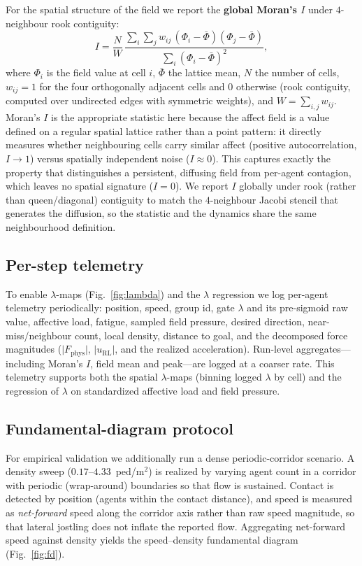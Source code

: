 \documentclass[sigconf,nonacm]{acmart}
\begin{document}
For the spatial structure of the field we report the \textbf{global Moran's
$I$} under $4$-neighbour rook contiguity:
\begin{equation}
I = \frac{N}{W}\,
\frac{\sum_i \sum_j w_{ij}\,(\Phi_i-\bar{\Phi})(\Phi_j-\bar{\Phi})}
     {\sum_i (\Phi_i-\bar{\Phi})^2},
\end{equation}
where $\Phi_i$ is the field value at cell $i$, $\bar{\Phi}$ the lattice mean,
$N$ the number of cells, $w_{ij}=1$ for the four orthogonally adjacent cells
and $0$ otherwise (rook contiguity, computed over undirected edges with
symmetric weights), and $W=\sum_{i,j} w_{ij}$. Moran's $I$ is the appropriate
statistic here because the affect field is a value defined on a regular spatial
lattice rather than a point pattern: it directly measures whether neighbouring
cells carry similar affect (positive autocorrelation, $I\!\to\!1$) versus
spatially independent noise ($I\!\approx\!0$). This captures exactly the
property that distinguishes a persistent, diffusing field from per-agent
contagion, which leaves no spatial signature ($I=0$). We report $I$ globally
under rook (rather than queen/diagonal) contiguity to match the $4$-neighbour
Jacobi stencil that generates the diffusion, so the statistic and the dynamics
share the same neighbourhood definition.

\subsection{Per-step telemetry}
To enable $\lambda$-maps (Fig.~\ref{fig:lambda}) and the $\lambda$ regression we
log per-agent telemetry periodically: position, speed, group id, gate $\lambda$
and its pre-sigmoid raw value, affective load, fatigue, sampled field pressure,
desired direction, near-miss/neighbour count, local density, distance to goal,
and the decomposed force magnitudes ($\lvert F_{\mathrm{phys}}\rvert$,
$\lvert u_{\mathrm{RL}}\rvert$, and the realized acceleration). Run-level
aggregates---including Moran's $I$, field mean and peak---are logged at a coarser
rate. This telemetry supports both the spatial $\lambda$-maps (binning logged
$\lambda$ by cell) and the regression of $\lambda$ on standardized affective
load and field pressure.

\subsection{Fundamental-diagram protocol}
For empirical validation we additionally run a dense periodic-corridor
scenario. A density sweep ($0.17$--$4.33$~ped/m$^2$) is realized by varying
agent count in a corridor with periodic (wrap-around) boundaries so that flow
is sustained. Contact is detected by position (agents within the contact
distance), and speed is measured as \emph{net-forward} speed along the corridor
axis rather than raw speed magnitude, so that lateral jostling does not inflate
the reported flow. Aggregating net-forward speed against density yields the
speed--density fundamental diagram (Fig.~\ref{fig:fd}).
\end{document}
